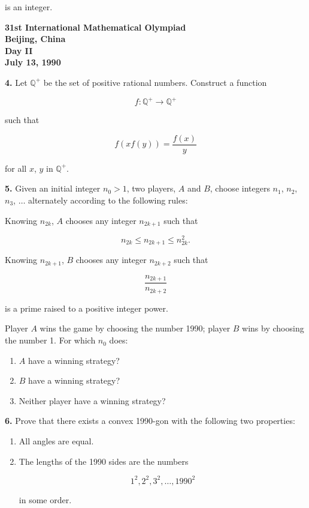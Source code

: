 \documentclass[12pt]{article}
\begin{document}
is an integer.

\newpage

\begin{center}
{\Large \textbf{31st International Mathematical Olympiad}}\\
\textbf{Beijing, China}\\
\textbf{\large Day II}\\
\textbf{July 13, 1990}
\end{center}

\vspace{0.3cm}

\noindent
\textbf{4.} Let $\mathbb{Q}^{+}$ be the set of positive rational numbers. Construct a function

\[
f : \mathbb{Q}^{+} \rightarrow \mathbb{Q}^{+}
\]

such that

\[
f(xf(y)) = \frac{f(x)}{y}
\]

for all $x$, $y$ in $\mathbb{Q}^{+}$.

\vspace{0.3cm}

\noindent
\textbf{5.} Given an initial integer $n_0 > 1$, two players, $A$ and $B$, choose integers
$n_1$, $n_2$, $n_3$, $\ldots$ alternately according to the following rules:

\vspace{0.2cm}

Knowing $n_{2k}$, $A$ chooses any integer $n_{2k+1}$ such that

\[
n_{2k} \leq n_{2k+1} \leq n_{2k}^{2}.
\]

Knowing $n_{2k+1}$, $B$ chooses any integer $n_{2k+2}$ such that

\[
\frac{n_{2k+1}}{n_{2k+2}}
\]

is a prime raised to a positive integer power.

\vspace{0.2cm}

Player $A$ wins the game by choosing the number 1990; player $B$ wins by choosing
the number 1. For which $n_0$ does:

\begin{enumerate}
\item[(a)] $A$ have a winning strategy?
\item[(b)] $B$ have a winning strategy?
\item[(c)] Neither player have a winning strategy?
\end{enumerate}

\vspace{0.3cm}

\noindent
\textbf{6.} Prove that there exists a convex 1990-gon with the following two properties:

\begin{enumerate}
\item[(a)] All angles are equal.
\item[(b)] The lengths of the 1990 sides are the numbers

\[
1^2, 2^2, 3^2, \ldots , 1990^2
\]

in some order.
\end{enumerate}
\end{document}
